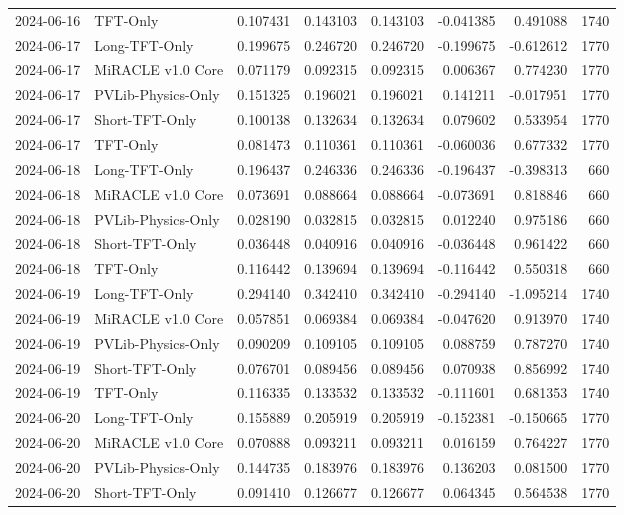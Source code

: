 \begin{tabular}{llrrrrrr}
2024-06-16 & TFT-Only & 0.107431 & 0.143103 & 0.143103 & -0.041385 & 0.491088 & 1740 \\
2024-06-17 & Long-TFT-Only & 0.199675 & 0.246720 & 0.246720 & -0.199675 & -0.612612 & 1770 \\
2024-06-17 & MiRACLE v1.0 Core & 0.071179 & 0.092315 & 0.092315 & 0.006367 & 0.774230 & 1770 \\
2024-06-17 & PVLib-Physics-Only & 0.151325 & 0.196021 & 0.196021 & 0.141211 & -0.017951 & 1770 \\
2024-06-17 & Short-TFT-Only & 0.100138 & 0.132634 & 0.132634 & 0.079602 & 0.533954 & 1770 \\
2024-06-17 & TFT-Only & 0.081473 & 0.110361 & 0.110361 & -0.060036 & 0.677332 & 1770 \\
2024-06-18 & Long-TFT-Only & 0.196437 & 0.246336 & 0.246336 & -0.196437 & -0.398313 & 660 \\
2024-06-18 & MiRACLE v1.0 Core & 0.073691 & 0.088664 & 0.088664 & -0.073691 & 0.818846 & 660 \\
2024-06-18 & PVLib-Physics-Only & 0.028190 & 0.032815 & 0.032815 & 0.012240 & 0.975186 & 660 \\
2024-06-18 & Short-TFT-Only & 0.036448 & 0.040916 & 0.040916 & -0.036448 & 0.961422 & 660 \\
2024-06-18 & TFT-Only & 0.116442 & 0.139694 & 0.139694 & -0.116442 & 0.550318 & 660 \\
2024-06-19 & Long-TFT-Only & 0.294140 & 0.342410 & 0.342410 & -0.294140 & -1.095214 & 1740 \\
2024-06-19 & MiRACLE v1.0 Core & 0.057851 & 0.069384 & 0.069384 & -0.047620 & 0.913970 & 1740 \\
2024-06-19 & PVLib-Physics-Only & 0.090209 & 0.109105 & 0.109105 & 0.088759 & 0.787270 & 1740 \\
2024-06-19 & Short-TFT-Only & 0.076701 & 0.089456 & 0.089456 & 0.070938 & 0.856992 & 1740 \\
2024-06-19 & TFT-Only & 0.116335 & 0.133532 & 0.133532 & -0.111601 & 0.681353 & 1740 \\
2024-06-20 & Long-TFT-Only & 0.155889 & 0.205919 & 0.205919 & -0.152381 & -0.150665 & 1770 \\
2024-06-20 & MiRACLE v1.0 Core & 0.070888 & 0.093211 & 0.093211 & 0.016159 & 0.764227 & 1770 \\
2024-06-20 & PVLib-Physics-Only & 0.144735 & 0.183976 & 0.183976 & 0.136203 & 0.081500 & 1770 \\
2024-06-20 & Short-TFT-Only & 0.091410 & 0.126677 & 0.126677 & 0.064345 & 0.564538 & 1770 \\

\end{tabular}
